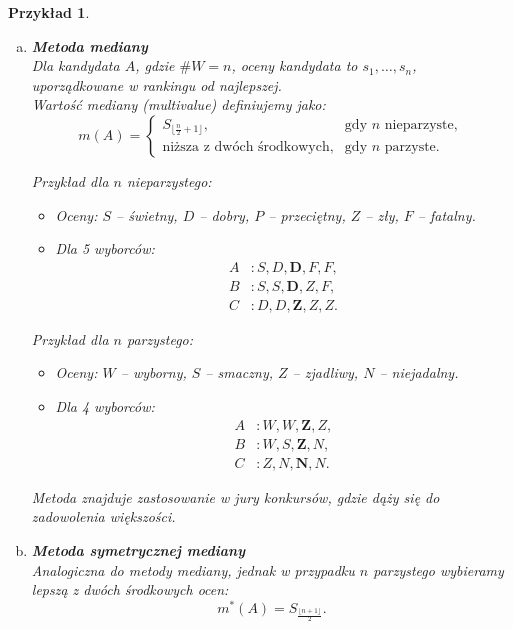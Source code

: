 \documentclass[12pt,a4paper]{article}
\theoremstyle{break}
\newtheorem{example}{Przykład}[section]
\begin{document}
	\begin{example}
		\begin{enumerate}[a)]
			\item \textbf{Metoda mediany} \\
			Dla kandydata $A$, gdzie $\# W = n$, oceny kandydata to $s_1, \dots, s_n$, uporządkowane w rankingu od najlepszej. \\
			Wartość mediany (multivalue) definiujemy jako:
			\[
			m(A) =
			\begin{cases}
				S_{\lfloor \frac{n}{2} + 1 \rfloor}, & \text{gdy } n \text{ nieparzyste}, \\
				\text{niższa z dwóch środkowych}, & \text{gdy } n \text{ parzyste}.
			\end{cases}
			\]
			
			Przykład dla $n$ nieparzystego:
			\begin{itemize}
				\item Oceny: $S$ -- świetny, $D$ -- dobry, $P$ -- przeciętny, $Z$ -- zły, $F$ -- fatalny.
				\item Dla 5 wyborców:
				\begin{align*}
					A &: S, D, \mathbf{D}, F, F, \\
					B &: S, S, \mathbf{D}, Z, F, \\
					C &: D, D, \mathbf{Z}, Z, Z.
				\end{align*}
			\end{itemize}
			
			Przykład dla $n$ parzystego:
			\begin{itemize}
				\item Oceny: $W$ -- wyborny, $S$ -- smaczny, $Z$ -- zjadliwy, $N$ -- niejadalny.
				\item Dla 4 wyborców:
				\begin{align*}
					A &: W, W, \mathbf{Z}, Z, \\
					B &: W, S, \mathbf{Z}, N, \\
					C &: Z, N, \mathbf{N}, N.
				\end{align*}
			\end{itemize}
			\textit{Metoda znajduje zastosowanie w jury konkursów, gdzie dąży się do zadowolenia większości.}
			
			\item \textbf{Metoda symetrycznej mediany} \\
			Analogiczna do metody mediany, jednak w przypadku $n$ parzystego wybieramy lepszą z dwóch środkowych ocen:
			\[
			m^*(A) = S_{\frac{\lfloor n + 1 \rfloor}{2}}.
			\]
			

\end{enumerate}
\end{example}
\end{document}
